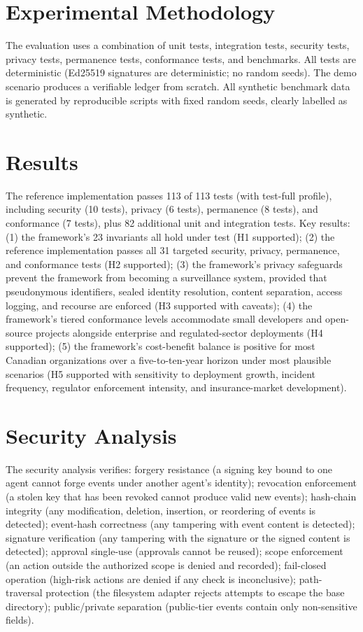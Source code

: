 \documentclass[11pt,a4paper]{article}
\begin{document}
\section{Experimental Methodology}
\label{sec:experimental-methodology}

The evaluation uses a combination of unit tests, integration tests, security tests, privacy tests, permanence tests, conformance tests, and benchmarks. All tests are deterministic (Ed25519 signatures are deterministic; no random seeds). The demo scenario produces a verifiable ledger from scratch. All synthetic benchmark data is generated by reproducible scripts with fixed random seeds, clearly labelled as synthetic.

\section{Results}
\label{sec:results}

The reference implementation passes 113 of 113 tests (with test-full profile), including security (10 tests), privacy (6 tests), permanence (8 tests), and conformance (7 tests), plus 82 additional unit and integration tests. Key results: (1) the framework's 23 invariants all hold under test (H1 supported); (2) the reference implementation passes all 31 targeted security, privacy, permanence, and conformance tests (H2 supported); (3) the framework's privacy safeguards prevent the framework from becoming a surveillance system, provided that pseudonymous identifiers, sealed identity resolution, content separation, access logging, and recourse are enforced (H3 supported with caveats); (4) the framework's tiered conformance levels accommodate small developers and open-source projects alongside enterprise and regulated-sector deployments (H4 supported); (5) the framework's cost-benefit balance is positive for most Canadian organizations over a five-to-ten-year horizon under most plausible scenarios (H5 supported with sensitivity to deployment growth, incident frequency, regulator enforcement intensity, and insurance-market development).

\section{Security Analysis}
\label{sec:security-analysis}

The security analysis verifies: forgery resistance (a signing key bound to one agent cannot forge events under another agent's identity); revocation enforcement (a stolen key that has been revoked cannot produce valid new events); hash-chain integrity (any modification, deletion, insertion, or reordering of events is detected); event-hash correctness (any tampering with event content is detected); signature verification (any tampering with the signature or the signed content is detected); approval single-use (approvals cannot be reused); scope enforcement (an action outside the authorized scope is denied and recorded); fail-closed operation (high-risk actions are denied if any check is inconclusive); path-traversal protection (the filesystem adapter rejects attempts to escape the base directory); public/private separation (public-tier events contain only non-sensitive fields).
\end{document}
